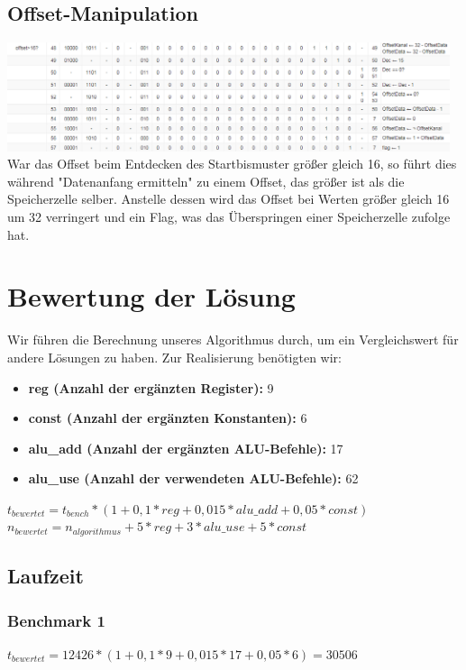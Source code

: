 \documentclass[12pt,titlepage,german,a4]{article}
\begin{document}
    \subsection{Offset-Manipulation}
	\includegraphics[width=13cm]{img/k6.png} \\
    War das Offset beim Entdecken des Startbismuster gr{\"o}{\ss}er gleich 16, so f{\"u}hrt dies w{\"a}hrend "Datenanfang ermitteln" zu einem Offset, das gr{\"o}{\ss}er ist als die Speicherzelle selber. Anstelle dessen wird das Offset bei Werten gr{\"o}{\ss}er gleich 16 um 32 verringert und ein Flag, was das {\"U}berspringen einer Speicherzelle zufolge hat.

    \newpage

    \section{Bewertung der L{\"o}sung}
    Wir f{\"u}hren die Berechnung unseres Algorithmus durch, um ein Vergleichswert f{\"u}r andere L{\"o}sungen zu haben. Zur Realisierung ben{\"o}tigten wir:
    \begin{itemize}
        \item \textbf{reg (Anzahl der erg{\"a}nzten Register):} 9
        \item \textbf{const (Anzahl der erg{\"a}nzten Konstanten):} 6
        \item \textbf{alu{\_}add (Anzahl der erg{\"a}nzten ALU-Befehle):} 17
        \item \textbf{alu{\_}use (Anzahl der verwendeten ALU-Befehle):} 62
    \end{itemize}
	$t_{bewertet} = t_{bench} * (1 + 0,1*reg + 0,015*alu{\_}add + 0,05*const)$ \\
	$n_{bewertet} = n_{algorithmus} + 5* reg + 3*alu{\_}use + 5* const$ \\

    \subsection{Laufzeit}

    \subsubsection{Benchmark 1}
    $t_{bewertet} = 12426 * (1 + 0,1*9 + 0,015*17 + 0,05*6) = 30506$
\end{document}

